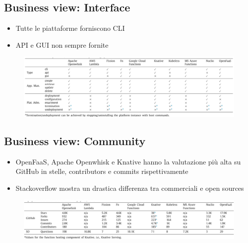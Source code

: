 \documentclass[a4paper, 12pt]{report}
\begin{document}
            \subsection{Business view: Interface}
            \begin{itemize}
              \item Tutte le piattaforme forniscono CLI
              \item API e GUI non sempre fornite
            \end{itemize}
            \begin{figure}[h]
              \centering
              \includegraphics[scale=0.35]{Immagini/Interface.png}
            \end{figure}
            \clearpage
            \subsection{Business view: Community}
            \begin{itemize}
              \item OpenFaaS, Apache Openwhisk e Knative hanno la valutazione più alta su GitHub in stelle, contributors e commits rispettivamente
              \item Stackoverflow mostra un drastica differenza tra commerciali e open sources
            \end{itemize}
            \begin{figure}[h]
              \centering
              \includegraphics[scale=0.3]{Immagini/Community.png}
            \end{figure}
\end{document}
